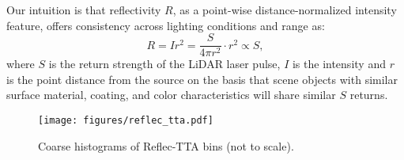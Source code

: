 \documentclass[10pt,twocolumn,letterpaper]{article}
\begin{document}
Our intuition is that reflectivity $R$, as a point-wise distance-normalized intensity feature, offers consistency across lighting conditions and range as:
\begin{equation}\label{equ:def_reflec}
    R = I r^{2} = \frac{S}{4 \pi r^2} \cdot r^{2} \propto S,
\end{equation}
where $S$ is the return strength of the LiDAR laser pulse, $I$ is the intensity and $r$ is the point distance from the source on the basis that scene objects with similar surface material, coating, and color characteristics will share similar $S$ returns.

\begin{figure}[thp]
    \centering
    \texttt{[image: figures/reflec\_tta.pdf]}
    \caption{Coarse histograms of Reflec-TTA bins (not to scale). }
    \label{fig:reflec_tta}
    \vspace{-5pt}
\end{figure}
\end{document}
